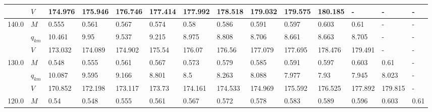 \begin{tabular}{|l|l|llllllllllll|}
      & $V$ &  174.976 &  175.946 &  176.746 &                   177.414 &                   177.992 &                   178.518 &  179.032\cellcolor{green} &                   179.575 &                   180.185 &                         - &                         - &                         - \\
\hline
140.0 & $M$ &    0.555 &    0.561 &    0.567 &                     0.574 &                      0.58 &                     0.586 &                     0.591 &    0.597\cellcolor{green} &                     0.603 &                      0.61 &                         - &                         - \\
      & $q_{km}$ &   10.461 &     9.95 &    9.537 &                     9.215 &                     8.975 &                     8.808 &                     8.706 &    8.661\cellcolor{green} &                     8.663 &                     8.705 &                         - &                         - \\
      & $V$ &  173.032 &  174.089 &  174.902 &                    175.54 &                    176.07 &                    176.56 &                   177.079 &  177.695\cellcolor{green} &                   178.476 &                   179.491 &                         - &                         - \\
\hline
130.0 & $M$ &    0.548 &    0.555 &    0.561 &                     0.567 &                     0.573 &                     0.579 &                     0.585 &                     0.591 &    0.597\cellcolor{green} &                     0.603 &                      0.61 &                         - \\
      & $q_{km}$ &   10.087 &    9.595 &    9.166 &                     8.801 &                       8.5 &                     8.263 &                     8.088 &                     7.977 &     7.93\cellcolor{green} &                     7.945 &                     8.023 &                         - \\
      & $V$ &  170.852 &  172.198 &  173.117 &                    173.73 &                   174.161 &                   174.533 &                   174.969 &                   175.592 &  176.525\cellcolor{green} &                   177.892 &                   179.815 &                         - \\
\hline
120.0 & $M$ &     0.54 &    0.548 &    0.555 &                     0.561 &                     0.567 &                     0.572 &                     0.578 &                     0.583 &                     0.589 &    0.596\cellcolor{green} &                     0.603 &                      0.61 \\

\end{tabular}
